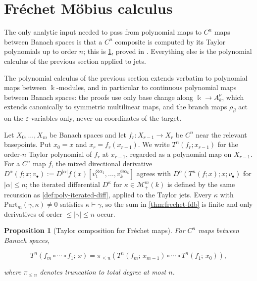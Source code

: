 \documentclass[10pt,a4paper]{article}
\theoremstyle{plain}
\newtheorem{proposition}[theorem]{Proposition}
\theoremstyle{definition}
\newcommand{\ik}{\Bbbk} %
\newcommand{\1}{\mathbb{1}} %
\newcommand{\eps}{\varepsilon} %
\newcommand{\KM}{\mathcal{M}} %
\newcommand{\Part}{\mathrm{Part}} %
\begin{document}
\section{Fréchet Möbius calculus}\label{fruxe9chet-muxf6bius-calculus}

The only analytic input needed to pass from polynomial maps to \(C^n\)
maps between Banach spaces is that a \(C^n\) composite is computed by
its Taylor polynomials up to order \(n\); this is
\ref{thm:taylor-composition}, proved in \citep{Hartmann2025FDB}.
Everything else is the polynomial calculus of the previous section
applied to jets.

The polynomial calculus of the previous section extends verbatim to
polynomial maps between \(\ik\)-modules, and in particular to continuous
polynomial maps between Banach spaces: the proofs use only base change
along \(\ik \to A_k^\nu\), which extends canonically to symmetric
multilinear maps, and the branch maps \(\rho_\beta\) act on the
\(\eps\)-variables only, never on coordinates of the target.

Let \(X_0, \dots, X_m\) be Banach spaces and let
\(f_r: X_{r-1} \to X_r\) be \(C^n\) near the relevant basepoints. Put
\(x_0 = x\) and \(x_r = f_r(x_{r-1})\). We write \(T^n(f_r; x_{r-1})\)
for the order-\(n\) Taylor polynomial of \(f_r\) at \(x_{r-1}\),
regarded as a polynomial map on \(X_{r-1}\). For a \(C^n\) map \(f\),
the mixed directional derivative
\(D^\alpha(f; x; v_\bullet) := D^{|\alpha|}f(x)[v_1^{\otimes \alpha_1}, \dots, v_k^{\otimes \alpha_k}]\)
agrees with \(D^\alpha(T^n(f; x); x; v_\bullet)\) for
\(|\alpha| \leq n\); the iterated differential \(D^\kappa\) for
\(\kappa \in \KM_+^m(k)\) is defined by the same recursion as
\ref{def:poly-iterated-diff}, applied to the Taylor jets. Every
\(\kappa\) with \(\Part_m(\gamma, \kappa) \neq 0\) satisfies
\(\kappa \vdash \gamma\), so the sum in \ref{thm:frechet-fdb} is finite
and only derivatives of order \(\leq |\gamma| \leq n\) occur.

\begin{proposition}[Taylor composition for Fréchet maps]

\label{thm:taylor-composition} For \(C^n\) maps between Banach spaces,

\[
  T^n(f_m \circ \cdots \circ f_1;\, x) = \pi_{\leq n}(T^n(f_m;\, x_{m-1}) \circ \cdots \circ T^n(f_1;\, x_0)),
\]

where \(\pi_{\leq n}\) denotes truncation to total degree at most \(n\).

\end{proposition}
\end{document}
